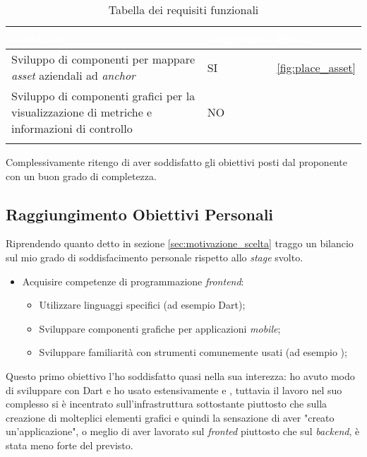 {
    \setlength{\freewidth}{\dimexpr\textwidth-10\tabcolsep}
    \renewcommand{\arraystretch}{1.5}
    \centering
    \setlength{\aboverulesep}{0pt}
    \setlength{\belowrulesep}{0pt}
    \begin{longtable}{C{.8\freewidth} C{.162\freewidth} C{.115\freewidth}}
       \toprule
    \textcolor{white}{\textbf{Obiettivo}}&
    \textcolor{white}{\textbf{Raggiunto}}&
    \textcolor{white}{\textbf{Fonte}}\\
    \toprule
    \endhead
    
    Sviluppo di componenti per mappare \textit{asset} aziendali ad \textit{anchor} & SI & \ref{fig:place_asset}\\
    Sviluppo di componenti grafici per la visualizzazione di metriche e informazioni di controllo& NO & \\

    \bottomrule
    \caption{Tabella dei requisiti funzionali}
    \end{longtable}
}
Complessivamente ritengo di aver soddisfatto gli obiettivi posti dal proponente con un buon grado di completezza.

\subsection{Raggiungimento Obiettivi Personali}
Riprendendo quanto detto in sezione \ref{sec:motivazione_scelta} traggo un bilancio sul mio grado di soddisfacimento personale rispetto allo \textit{stage} svolto.

\begin{itemize}
  \item Acquisire competenze di programmazione \textit{frontend}:
      \begin{itemize}
          \item Utilizzare linguaggi specifici (ad esempio Dart);
          \item Sviluppare componenti grafiche per applicazioni \textit{mobile};
          \item Sviluppare familiarità con strumenti comunemente usati (ad esempio \vsc);
      \end{itemize}
\end{itemize}

Questo primo obiettivo l'ho soddisfatto quasi nella sua interezza: ho avuto modo di sviluppare con Dart e ho usato estensivamente \vsc{} e \astudio{}, tuttavia il lavoro nel suo complesso si è incentrato sull'infrastruttura sottostante piuttosto che sulla creazione di molteplici elementi grafici e quindi la sensazione di aver "creato un'applicazione", o meglio di aver lavorato sul \textit{fronted} piuttosto che sul \textit{backend}, è stata meno forte del previsto.

